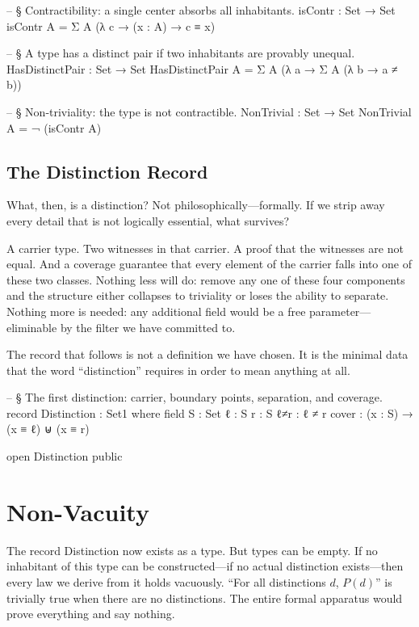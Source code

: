 \documentclass[11pt,a4paper]{book}
\def\texttt#1{#1}%
\begin{document}
\begin{code}
-- § Contractibility: a single center absorbs all inhabitants.
isContr : Set → Set
isContr A = Σ A (λ c → (x : A) → c ≡ x)

-- § A type has a distinct pair if two inhabitants are provably unequal.
HasDistinctPair : Set → Set
HasDistinctPair A = Σ A (λ a → Σ A (λ b → a ≠ b))

-- § Non-triviality: the type is not contractible.
NonTrivial : Set → Set
NonTrivial A = ¬ (isContr A)
\end{code}

\section{The Distinction Record}

What, then, is a distinction? Not philosophically—formally. If we strip away every detail that is not logically essential, what survives?

A carrier type. Two witnesses in that carrier. A proof that the witnesses are not equal. And a coverage guarantee that every element of the carrier falls into one of these two classes. Nothing less will do: remove any one of these four components and the structure either collapses to triviality or loses the ability to separate. Nothing more is needed: any additional field would be a free parameter—eliminable by the filter we have committed to.

The record that follows is not a definition we have chosen. It is the minimal data that the word ``distinction'' requires in order to mean anything at all.

\begin{code}
-- § The first distinction: carrier, boundary points, separation, and coverage.
record Distinction : Set1 where
  field
    S     : Set
    ℓ     : S
    r     : S
    ℓ≠r   : ℓ ≠ r
    cover : (x : S) → (x ≡ ℓ) ⊎ (x ≡ r)

open Distinction public
\end{code}

\chapter{Non-Vacuity}

The record \texttt{Distinction} now exists as a type. But types can be empty. If no inhabitant of this type can be constructed—if no actual distinction exists—then every law we derive from it holds vacuously. ``For all distinctions $d$, $P(d)$'' is trivially true when there are no distinctions. The entire formal apparatus would prove everything and say nothing.
\end{document}
